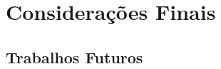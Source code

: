 \chapter[Considerações Finais]{Considerações Finais}

  \section[Trabalhos Futuros]{Trabalhos Futuros}
